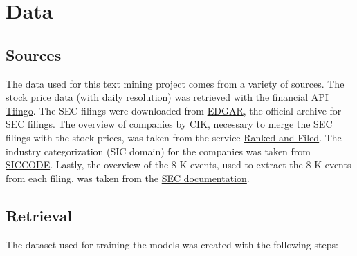 \documentclass{article}
\begin{document}
	\section{Data}
	
	\subsection{Sources}
	
	The data used for this text mining project comes from a variety of sources. The stock price data (with daily resolution) was retrieved with the financial API \href{https://www.tiingo.com}{Tiingo}. The SEC filings were downloaded from \href{https://www.sec.gov/Archives/edgar/full-index/}{EDGAR}, the official archive for SEC filings. The overview of companies by CIK, necessary to merge the SEC filings with the stock prices, was taken from the service \href{http://rankandfiled.com/#/data/tickers}{Ranked and Filed}. The industry categorization (SIC domain) for the companies was taken from \href{https://siccode.com}{SICCODE}. Lastly, the overview of the 8-K events, used to extract the 8-K events from each filing, was taken from the  \href{https://www.sec.gov/fast-answers/answersform8khtm.html}{SEC documentation}. 
	
	\subsection{Retrieval}
	
	The dataset used for training the models was created with the following steps: 
	
\end{document}
